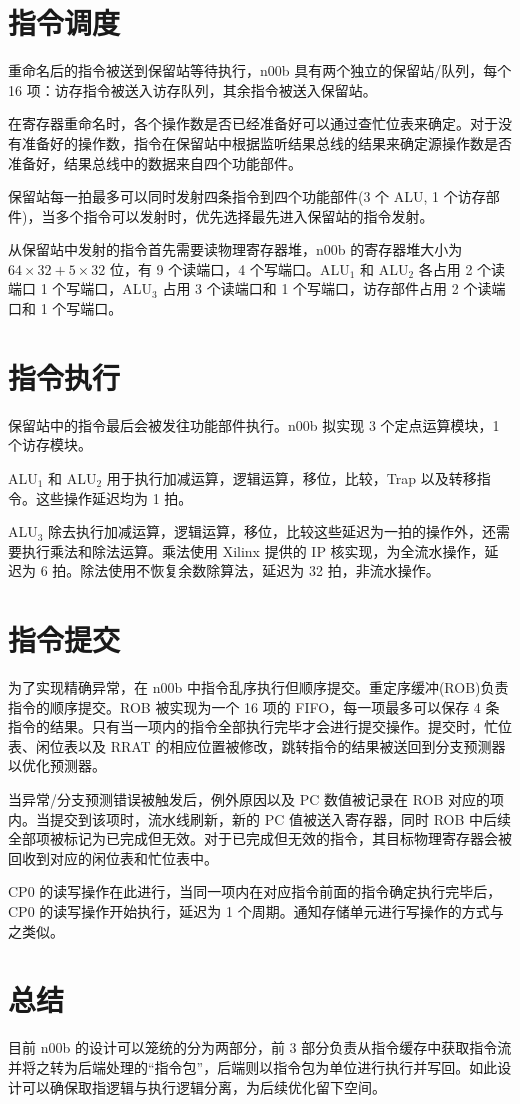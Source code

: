 \documentclass[blue,normal,cn]{elegantnote}
\begin{document}
\section{指令调度}

重命名后的指令被送到保留站等待执行，n00b 具有两个独立的保留站/队列，每个 16 项：访存指令被送入访存队列，其余指令被送入保留站。

在寄存器重命名时，各个操作数是否已经准备好可以通过查忙位表来确定。对于没有准备好的操作数，指令在保留站中根据监听结果总线的结果来确定源操作数是否准备好，结果总线中的数据来自四个功能部件。

保留站每一拍最多可以同时发射四条指令到四个功能部件(3 个 ALU, 1 个访存部件)，当多个指令可以发射时，优先选择最先进入保留站的指令发射。

从保留站中发射的指令首先需要读物理寄存器堆，n00b 的寄存器堆大小为 $64 \times 32 + 5 \times 32$ 位，有 9 个读端口，4 个写端口。ALU$_1$ 和 ALU$_2$ 各占用 2 个读端口 1 个写端口，ALU$_3$ 占用 3 个读端口和 1 个写端口，访存部件占用 2 个读端口和 1 个写端口。

\section{指令执行}

保留站中的指令最后会被发往功能部件执行。n00b 拟实现 3 个定点运算模块，1 个访存模块。

ALU$_1$ 和 ALU$_2$ 用于执行加减运算，逻辑运算，移位，比较，Trap 以及转移指令。这些操作延迟均为 1 拍。

ALU$_3$ 除去执行加减运算，逻辑运算，移位，比较这些延迟为一拍的操作外，还需要执行乘法和除法运算。乘法使用 Xilinx 提供的 IP 核实现，为全流水操作，延迟为 6 拍。除法使用不恢复余数除算法，延迟为 32 拍，非流水操作。

\section{指令提交}
为了实现精确异常，在 n00b 中指令乱序执行但顺序提交。重定序缓冲(ROB)负责指令的顺序提交。ROB 被实现为一个 16 项的 FIFO，每一项最多可以保存 4 条指令的结果。只有当一项内的指令全部执行完毕才会进行提交操作。提交时，忙位表、闲位表以及 RRAT 的相应位置被修改，跳转指令的结果被送回到分支预测器以优化预测器。

当异常/分支预测错误被触发后，例外原因以及 PC 数值被记录在 ROB 对应的项内。当提交到该项时，流水线刷新，新的 PC 值被送入寄存器，同时 ROB 中后续全部项被标记为已完成但无效。对于已完成但无效的指令，其目标物理寄存器会被回收到对应的闲位表和忙位表中。

CP0 的读写操作在此进行，当同一项内在对应指令前面的指令确定执行完毕后，CP0 的读写操作开始执行，延迟为 1 个周期。通知存储单元进行写操作的方式与之类似。

\section{总结}
目前 n00b 的设计可以笼统的分为两部分，前 3 部分负责从指令缓存中获取指令流并将之转为后端处理的``指令包''，后端则以指令包为单位进行执行并写回。如此设计可以确保取指逻辑与执行逻辑分离，为后续优化留下空间。
\end{document}
